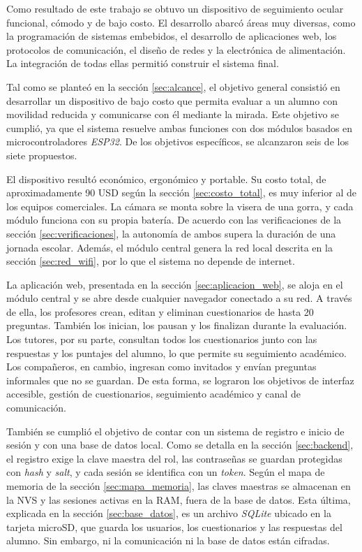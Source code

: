 Como resultado de este trabajo se obtuvo un dispositivo de seguimiento ocular funcional, cómodo y de bajo costo. El desarrollo abarcó áreas muy diversas, como la programación de sistemas embebidos, el desarrollo de aplicaciones web, los protocolos de comunicación, el diseño de redes y la electrónica de alimentación. La integración de todas ellas permitió construir el sistema final.

Tal como se planteó en la sección \ref{sec:alcance}, el objetivo general consistió en desarrollar un dispositivo de bajo costo que permita evaluar a un alumno con movilidad reducida y comunicarse con él mediante la mirada. Este objetivo se cumplió, ya que el sistema resuelve ambas funciones con dos módulos basados en microcontroladores \emph{ESP32}. De los objetivos específicos, se alcanzaron seis de los siete propuestos.

El dispositivo resultó económico, ergonómico y portable. Su costo total, de aproximadamente 90 USD según la sección \ref{sec:costo_total}, es muy inferior al de los equipos comerciales. La cámara se monta sobre la visera de una gorra, y cada módulo funciona con su propia batería. De acuerdo con las verificaciones de la sección \ref{sec:verificaciones}, la autonomía de ambos supera la duración de una jornada escolar. Además, el módulo central genera la red local descrita en la sección \ref{sec:red_wifi}, por lo que el sistema no depende de internet.

La aplicación web, presentada en la sección \ref{sec:aplicacion_web}, se aloja en el módulo central y se abre desde cualquier navegador conectado a su red. A través de ella, los profesores crean, editan y eliminan cuestionarios de hasta 20 preguntas. También los inician, los pausan y los finalizan durante la evaluación. Los tutores, por su parte, consultan todos los cuestionarios junto con las respuestas y los puntajes del alumno, lo que permite su seguimiento académico. Los compañeros, en cambio, ingresan como invitados y envían preguntas informales que no se guardan. De esta forma, se lograron los objetivos de interfaz accesible, gestión de cuestionarios, seguimiento académico y canal de comunicación.

También se cumplió el objetivo de contar con un sistema de registro e inicio de sesión y con una base de datos local. Como se detalla en la sección \ref{sec:backend}, el registro exige la clave maestra del rol, las contraseñas se guardan protegidas con \emph{hash} y \emph{salt}, y cada sesión se identifica con un \emph{token}. Según el mapa de memoria de la sección \ref{sec:mapa_memoria}, las claves maestras se almacenan en la NVS y las sesiones activas en la RAM, fuera de la base de datos. Esta última, explicada en la sección \ref{sec:base_datos}, es un archivo \emph{SQLite} ubicado en la tarjeta microSD, que guarda los usuarios, los cuestionarios y las respuestas del alumno. Sin embargo, ni la comunicación ni la base de datos están cifradas. 


